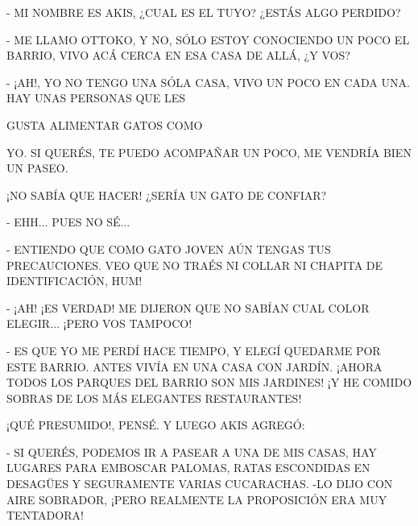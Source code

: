 \newpage
{}
\begin{minipage}{.5\textwidth}
	- MI NOMBRE ES AKIS, ¿CUAL ES EL TUYO? ¿ESTÁS ALGO PERDIDO?
	
	- ME LLAMO OTTOKO, Y NO, SÓLO ESTOY CONOCIENDO UN POCO EL BARRIO, VIVO ACÁ CERCA EN ESA CASA DE ALLÁ, ¿Y VOS?
	
	- ¡AH!, YO NO TENGO UNA SÓLA CASA, VIVO UN POCO EN CADA UNA. HAY UNAS PERSONAS QUE LES
	
	GUSTA ALIMENTAR GATOS COMO 
	
	YO. SI QUERÉS, TE PUEDO ACOMPAÑAR UN POCO, ME VENDRÍA BIEN UN PASEO.
	
	¡NO SABÍA QUE HACER! ¿SERÍA UN GATO DE CONFIAR? 
\end{minipage}	

\newpage
{}
- EHH... PUES NO SÉ...

- ENTIENDO QUE COMO GATO JOVEN AÚN TENGAS TUS PRECAUCIONES. VEO QUE NO TRAÉS NI COLLAR NI CHAPITA DE IDENTIFICACIÓN, HUM!

- ¡AH! ¡ES VERDAD! ME DIJERON QUE NO SABÍAN CUAL COLOR ELEGIR$\ldots$ ¡PERO VOS TAMPOCO!

- ES QUE YO ME PERDÍ HACE TIEMPO, Y ELEGÍ QUEDARME POR ESTE BARRIO. ANTES VIVÍA EN UNA CASA CON JARDÍN. ¡AHORA TODOS LOS PARQUES DEL BARRIO SON MIS JARDINES! ¡Y HE COMIDO SOBRAS DE LOS MÁS ELEGANTES RESTAURANTES!

¡QUÉ PRESUMIDO!, PENSÉ. Y LUEGO AKIS AGREGÓ:

- SI QUERÉS, PODEMOS IR A PASEAR A UNA DE MIS CASAS, HAY LUGARES PARA EMBOSCAR PALOMAS, RATAS ESCONDIDAS  EN DESAGÜES Y SEGURAMENTE VARIAS CUCARACHAS. -LO DIJO CON AIRE SOBRADOR, ¡PERO REALMENTE LA PROPOSICIÓN ERA MUY TENTADORA!



